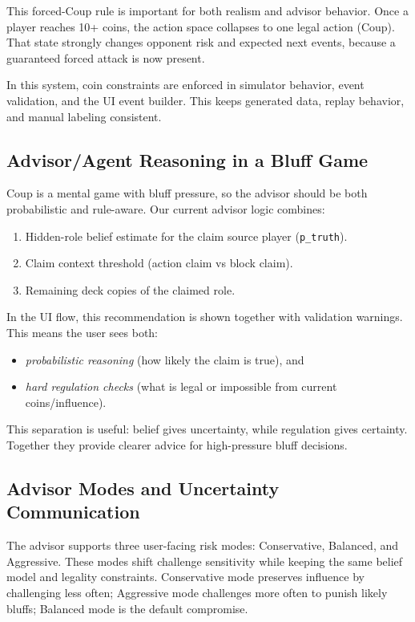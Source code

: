 \documentclass[11pt]{article}
\begin{document}
This forced-Coup rule is important for both realism and advisor behavior. Once a player reaches 10+ coins, the action space collapses to one legal action (Coup). That state strongly changes opponent risk and expected next events, because a guaranteed forced attack is now present.

In this system, coin constraints are enforced in simulator behavior, event validation, and the UI event builder. This keeps generated data, replay behavior, and manual labeling consistent.

\subsection{Advisor/Agent Reasoning in a Bluff Game}
Coup is a mental game with bluff pressure, so the advisor should be both probabilistic and rule-aware. Our current advisor logic combines:
\begin{enumerate}
  \item Hidden-role belief estimate for the claim source player (\texttt{p\_truth}).
  \item Claim context threshold (action claim vs block claim).
  \item Remaining deck copies of the claimed role.
\end{enumerate}

In the UI flow, this recommendation is shown together with validation warnings. This means the user sees both:
\begin{itemize}
  \item \textit{probabilistic reasoning} (how likely the claim is true), and
  \item \textit{hard regulation checks} (what is legal or impossible from current coins/influence).
\end{itemize}

This separation is useful: belief gives uncertainty, while regulation gives certainty. Together they provide clearer advice for high-pressure bluff decisions.

\subsection{Advisor Modes and Uncertainty Communication}
The advisor supports three user-facing risk modes: Conservative, Balanced, and Aggressive. These modes shift challenge sensitivity while keeping the same belief model and legality constraints. Conservative mode preserves influence by challenging less often; Aggressive mode challenges more often to punish likely bluffs; Balanced mode is the default compromise.
\end{document}
